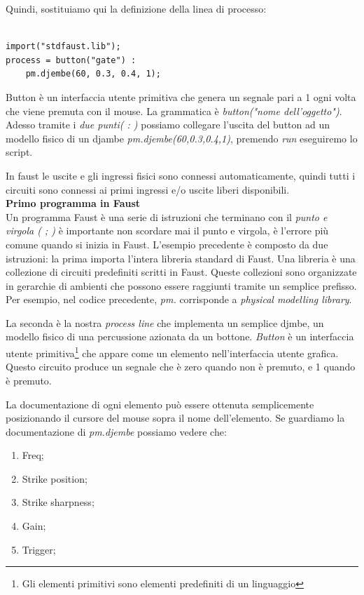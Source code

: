 \documentclass[11pt]{article}
\begin{document}
\begin{multicols*}{2}
Quindi, sostituiamo qui la definizione della linea di processo:

\begin{Verbatim}[fontsize=\footnotesize]

import("stdfaust.lib");
process = button("gate") : 
	pm.djembe(60, 0.3, 0.4, 1);

\end{Verbatim}

Button è un interfaccia utente primitiva che genera un segnale pari a 1 ogni volta che viene premuta con il mouse. La grammatica è \textit{button("nome dell'oggetto")}. Adesso tramite i \textit{due punti( : )} possiamo collegare l'uscita del button ad un modello fisico di un djambe \textit{pm.djembe(60,0.3,0.4,1)}, premendo \textit{run} eseguiremo lo script.

In faust le uscite e gli ingressi fisici sono connessi automaticamente, quindi tutti i circuiti sono connessi ai primi ingressi e/o uscite liberi disponibili.\\

\textbf{Primo programma in Faust}\\

Un programma Faust è una serie di istruzioni che terminano con il \textit{punto e virgola ( ; )} è importante non scordare mai il punto e virgola, è l'errore più comune quando si inizia in Faust. L'esempio precedente è composto da due istruzioni: la prima importa l'intera libreria standard di Faust. Una libreria è una collezione di circuiti predefiniti scritti in Faust. Queste collezioni sono organizzate in gerarchie di ambienti che possono essere raggiunti tramite un semplice prefisso. Per esempio, nel codice precedente, \textit{pm.} corrisponde a \textit{physical modelling library}.

La seconda è la nostra \textit{process line} che implementa un semplice djmbe, un modello fisico di una percussione azionata da un bottone. \textit{Button} è un interfaccia utente primitiva\footnote{Gli elementi primitivi sono elementi predefiniti di un linguaggio } che appare come un elemento nell'interfaccia utente grafica. Questo circuito produce un segnale che è zero quando non è premuto, e 1 quando è premuto.

La documentazione di ogni elemento può essere ottenuta semplicemente posizionando il cursore del mouse sopra il nome dell'elemento. Se guardiamo la documentazione di \textit{pm.djembe} possiamo vedere che:

\begin{enumerate}
\item Freq; 
\item Strike position; 
\item Strike sharpness;
\item Gain;
\item Trigger;
\end{enumerate}


\end{multicols*}
\end{document}
